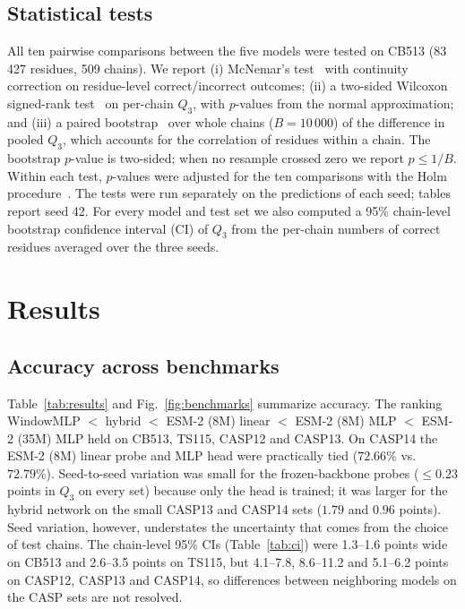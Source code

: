 \documentclass[preprint,12pt,authoryear]{elsarticle}
\begin{document}
\subsection{Statistical tests}
All ten pairwise comparisons between the five models were tested on CB513 (83\,427 residues, 509 chains). We report (i) McNemar's test~\citep{mcnemar1947note} with continuity correction on residue-level correct/incorrect outcomes; (ii) a two-sided Wilcoxon signed-rank test~\citep{wilcoxon1945individual} on per-chain $Q_3$, with $p$-values from the normal approximation; and (iii) a paired bootstrap~\citep{efron1979bootstrap} over whole chains ($B=10\,000$) of the difference in pooled $Q_3$, which accounts for the correlation of residues within a chain. The bootstrap $p$-value is two-sided; when no resample crossed zero we report $p \leq 1/B$. Within each test, $p$-values were adjusted for the ten comparisons with the Holm procedure~\citep{holm1979simple}. The tests were run separately on the predictions of each seed; tables report seed 42. For every model and test set we also computed a 95\% chain-level bootstrap confidence interval (CI) of $Q_3$ from the per-chain numbers of correct residues averaged over the three seeds.

\section{Results}
\label{sec:results}

\subsection{Accuracy across benchmarks}
Table~\ref{tab:results} and Fig.~\ref{fig:benchmarks} summarize accuracy. The ranking WindowMLP $<$ hybrid $<$ ESM-2 (8M) linear $<$ ESM-2 (8M) MLP $<$ ESM-2 (35M) MLP held on CB513, TS115, CASP12 and CASP13. On CASP14 the ESM-2 (8M) linear probe and MLP head were practically tied ($72.66\%$ vs.\ $72.79\%$). Seed-to-seed variation was small for the frozen-backbone probes ($\leq 0.23$ points in $Q_3$ on every set) because only the head is trained; it was larger for the hybrid network on the small CASP13 and CASP14 sets ($1.79$ and $0.96$ points). Seed variation, however, understates the uncertainty that comes from the choice of test chains. The chain-level 95\% CIs (Table~\ref{tab:ci}) were 1.3--1.6 points wide on CB513 and 2.6--3.5 points on TS115, but 4.1--7.8, 8.6--11.2 and 5.1--6.2 points on CASP12, CASP13 and CASP14, so differences between neighboring models on the CASP sets are not resolved.
\end{document}
